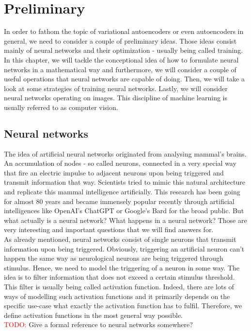 \chapter{Preliminary}\label{preliminary}
In order to fathom the topic of variational autoencoders or even autoencoders in general, we need to consider a couple of preliminary ideas. Those ideas consist mainly of neural networks and their optimization - usually being called training. In this chapter, we will tackle the conceptional idea of how to formulate neural networks in a mathematical way and furthermore, we will consider a couple of useful operations that neural networks are capable of doing. Then, we will take a look at some strategies of training neural networks. Lastly, we will consider neural networks operating on images. This discipline of machine learning is usually referred to as computer vision.

\section{Neural networks}
The idea of artificial neural networks originated from analysing mammal's brains. An accumulation of nodes - so called neurons, connected in a very special way that fire an electric impulse to adjacent neurons upon being triggered and transmit information that way. Scientists tried to mimic this natural architecture and replicate this mammal intelligence artificially. This research has been going for almost 80 years and became immensely popular recently through artificial intelligences like OpenAI's ChatGPT or Google's Bard for the broad public. But what actually is a neural network? What happens in a neural network? Those are very interesting and important questions that we will find answers for.\\
As already mentioned, neural networks consist of single neurons that transmit information upon being \glqq triggered\grqq{}. Obviously, triggering an artificial neuron can't happen the same way as neurological neurons are being triggered through stimulus. Hence, we need to model the triggering of a neuron in some way. The idea is to filter information that does not exceed a certain stimulus threshold. This filter is usually being called activation function. Indeed, there are lots of ways of modelling such activation functions and it primarily depends on the specific use-case what exactly the activation function has to fulfil. Therefore, we define activation functions in the most general way possible.\\
\textcolor{red}{TODO:} Give a formal reference to neural networks somewhere?

